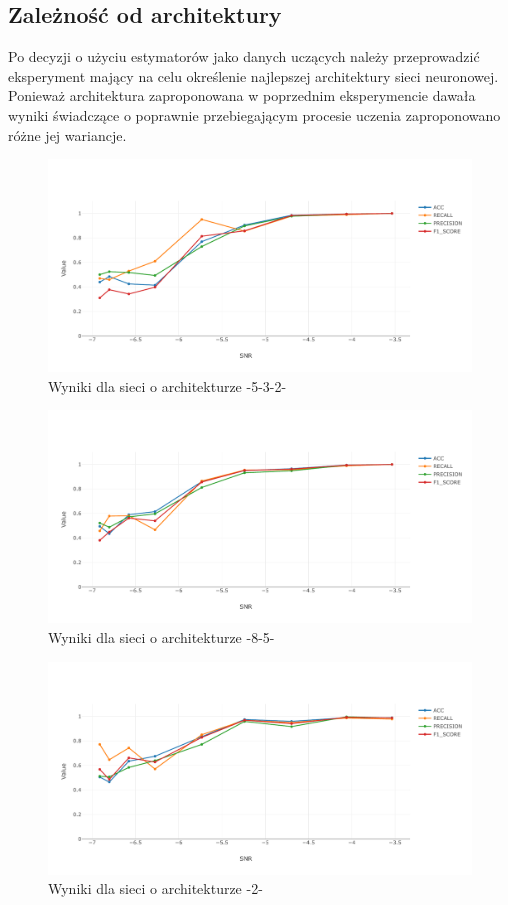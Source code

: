 \documentclass[12pt, a4paper, oneside]{article}
\begin{document}
	\subsection{Zależność od architektury}
	Po decyzji o użyciu estymatorów jako danych uczących należy przeprowadzić eksperyment mający na celu określenie najlepszej architektury sieci neuronowej. Ponieważ architektura zaproponowana w poprzednim eksperymencie dawała wyniki świadczące o poprawnie przebiegającym procesie uczenia zaproponowano różne jej wariancje. 
		\begin{figure}[H]
		\includegraphics[width=16cm]{images/nn_small_532.pdf}
		\caption{Wyniki dla sieci o architekturze -5-3-2-}
	\end{figure}
	\begin{figure}[H]
		\includegraphics[width=16cm]{images/nn_small_85.pdf}
		\caption{Wyniki dla sieci o architekturze -8-5-}
	\end{figure}
		\begin{figure}[H]
			\includegraphics[width=16cm]{images/nn_small_2.pdf}
			\caption{Wyniki dla sieci o architekturze -2-}
		\end{figure}
\end{document}
